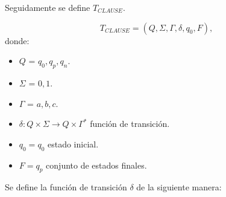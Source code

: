 Seguidamente se define $T_{CLAUSE}$.

\[
    T_{CLAUSE} = (Q, {\Sigma}, \Gamma, \delta, q_{0}, F),
\]
donde:
\begin{itemize}
    \item \(Q\) = ${q_0,q_p,q_n}$.
    \item \(\Sigma\) = ${0,1}$.
    \item \(\Gamma\) = ${a,b,c}$.
    \item \(\delta: Q \times \Sigma \to Q \times \Gamma^*\) función de transición.
    \item \(q_{0} = q_0\) estado inicial.
    \item \(F={q_p}\) conjunto de estados finales.
\end{itemize}

Se define la función de transición $\delta$ de la siguiente manera:

